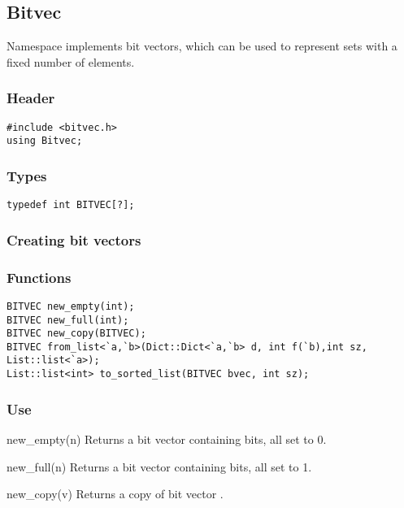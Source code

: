 \subsection{Bitvec}

Namespace  implements bit vectors, which can be used to
represent sets with a fixed number of elements.

\subsubsection*{Header}
\begin{verbatim}
#include <bitvec.h>
using Bitvec;
\end{verbatim}

\subsubsection*{Types}
\begin{verbatim}
typedef int BITVEC[?];
\end{verbatim}

\subsubsection*{Creating bit vectors}

\subsubsection*{Functions}
\begin{verbatim}
BITVEC new_empty(int);
BITVEC new_full(int);
BITVEC new_copy(BITVEC);
BITVEC from_list<`a,`b>(Dict::Dict<`a,`b> d, int f(`b),int sz, List::list<`a>);
List::list<int> to_sorted_list(BITVEC bvec, int sz);
\end{verbatim}

\subsubsection*{Use}

\begin{defun}{new_empty}{(n)}
Returns a bit vector containing  bits, all set to 0.
\end{defun}

\begin{defun}{new_full}{(n)}
Returns a bit vector containing  bits, all set to 1.
\end{defun}

\begin{defun}{new_copy}{(v)}
Returns a copy of bit vector .
\end{defun}


